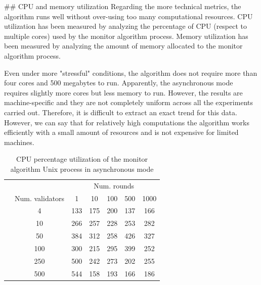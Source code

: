 \documentclass[a4paper,11pt,oneside]{report}
\begin{document}
\begin{markdown}

## CPU and memory utilization
Regarding the more technical metrics, the algorithm runs well without over-using too many computational resources.
CPU utilization has been measured by analyzing the percentage of CPU (respect to multiple cores) used by the monitor algorithm process.
Memory utilization has been measured by analyzing the amount of memory allocated to the monitor algorithm process.

Even under more "stressful" conditions, the algorithm does not require more than four cores and 500 megabytes to run.  
Apparently, the asynchronous mode requires slightly more cores but less memory to run. However, the results are machine-specific and they are not completely uniform across all the experiments carried out. 
Therefore, it is difficult to extract an exact trend for this data. However, we can say that for relatively high computations the algorithm works efficiently with a small amount of resources and is not expensive for limited machines.

\end{markdown}


\begin{table}[]
\centering
\begin{tabular}{l|c|c|c|c|c|c|}
\cline{2-7}
                  &   & \multicolumn{5}{c|}{Num. rounds} \\ \cline{2-7} 
\multirow{7}{*}{} & Num. validators & 1   & 10   & 100  & 500  & 1000  \\ \cline{2-7} 
                  & 4               & 133 & 175  & 200 & 137  & 166       \\ \cline{2-7} 
                  & 10              & 266   & 257   & 228  & 253  &  282     \\ \cline{2-7} 
                  & 50              & 384    & 312     & 258      &  426    & 327      \\ \cline{2-7} 
                  & 100             & 300    & 215     & 295     & 399     &   252    \\ \cline{2-7} 
                  & 250             & 500    &  242    & 273     & 202      & 255      \\ \cline{2-7} 
                  & 500             &  544   &  158    & 193     &  166    &  186     \\ \cline{2-7} 
\end{tabular}
\caption{CPU percentage utilization of the monitor algorithm Unix process in asynchronous mode}
\end{table}
\end{document}
